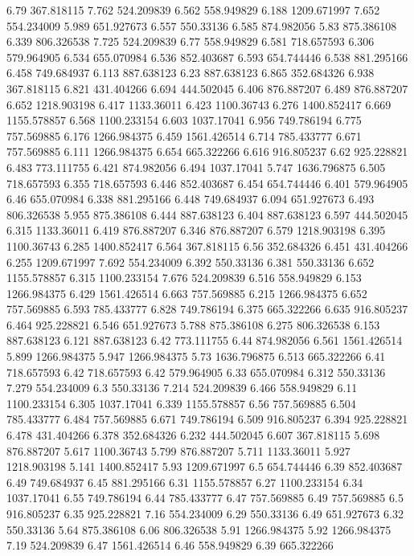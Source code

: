6.79	367.818115
7.762	524.209839
6.562	558.949829
6.188	1209.671997
7.652	554.234009
5.989	651.927673
6.557	550.33136
6.585	874.982056
5.83	875.386108
6.339	806.326538
7.725	524.209839
6.77	558.949829
6.581	718.657593
6.306	579.964905
6.534	655.070984
6.536	852.403687
6.593	654.744446
6.538	881.295166
6.458	749.684937
6.113	887.638123
6.23	887.638123
6.865	352.684326
6.938	367.818115
6.821	431.404266
6.694	444.502045
6.406	876.887207
6.489	876.887207
6.652	1218.903198
6.417	1133.36011
6.423	1100.36743
6.276	1400.852417
6.669	1155.578857
6.568	1100.233154
6.603	1037.17041
6.956	749.786194
6.775	757.569885
6.176	1266.984375
6.459	1561.426514
6.714	785.433777
6.671	757.569885
6.111	1266.984375
6.654	665.322266
6.616	916.805237
6.62	925.228821
6.483	773.111755
6.421	874.982056
6.494	1037.17041
5.747	1636.796875
6.505	718.657593
6.355	718.657593
6.446	852.403687
6.454	654.744446
6.401	579.964905
6.46	655.070984
6.338	881.295166
6.448	749.684937
6.094	651.927673
6.493	806.326538
5.955	875.386108
6.444	887.638123
6.404	887.638123
6.597	444.502045
6.315	1133.36011
6.419	876.887207
6.346	876.887207
6.579	1218.903198
6.395	1100.36743
6.285	1400.852417
6.564	367.818115
6.56	352.684326
6.451	431.404266
6.255	1209.671997
7.692	554.234009
6.392	550.33136
6.381	550.33136
6.652	1155.578857
6.315	1100.233154
7.676	524.209839
6.516	558.949829
6.153	1266.984375
6.429	1561.426514
6.663	757.569885
6.215	1266.984375
6.652	757.569885
6.593	785.433777
6.828	749.786194
6.375	665.322266
6.635	916.805237
6.464	925.228821
6.546	651.927673
5.788	875.386108
6.275	806.326538
6.153	887.638123
6.121	887.638123
6.42	773.111755
6.44	874.982056
6.561	1561.426514
5.899	1266.984375
5.947	1266.984375
5.73	1636.796875
6.513	665.322266
6.41	718.657593
6.42	718.657593
6.42	579.964905
6.33	655.070984
6.312	550.33136
7.279	554.234009
6.3	550.33136
7.214	524.209839
6.466	558.949829
6.11	1100.233154
6.305	1037.17041
6.339	1155.578857
6.56	757.569885
6.504	785.433777
6.484	757.569885
6.671	749.786194
6.509	916.805237
6.394	925.228821
6.478	431.404266
6.378	352.684326
6.232	444.502045
6.607	367.818115
5.698	876.887207
5.617	1100.36743
5.799	876.887207
5.711	1133.36011
5.927	1218.903198
5.141	1400.852417
5.93	1209.671997
6.5	654.744446
6.39	852.403687
6.49	749.684937
6.45	881.295166
6.31	1155.578857
6.27	1100.233154
6.34	1037.17041
6.55	749.786194
6.44	785.433777
6.47	757.569885
6.49	757.569885
6.5	916.805237
6.35	925.228821
7.16	554.234009
6.29	550.33136
6.49	651.927673
6.32	550.33136
5.64	875.386108
6.06	806.326538
5.91	1266.984375
5.92	1266.984375
7.19	524.209839
6.47	1561.426514
6.46	558.949829
6.39	665.322266
